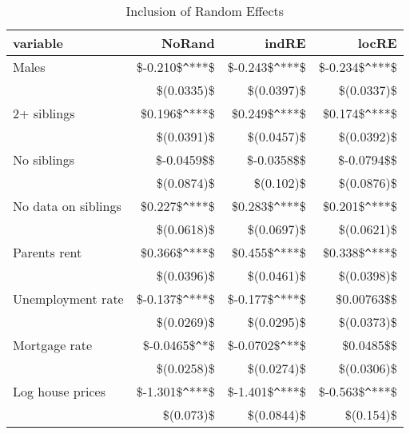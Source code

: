 \begin{table}[ht]
\centering
\begin{tabular}{lrrr}
  \hline
variable & NoRand & indRE & locRE \\ 
  \hline
Males & \$-0.210\$\verb|^|***\$ & \$-0.243\$\verb|^|***\$ & \$-0.234\$\verb|^|***\$ \\ 
   & \$(0.0335)\$ & \$(0.0397)\$ & \$(0.0337)\$ \\ 
  2+ siblings & \$0.196\$\verb|^|***\$ & \$0.249\$\verb|^|***\$ & \$0.174\$\verb|^|***\$ \\ 
   & \$(0.0391)\$ & \$(0.0457)\$ & \$(0.0392)\$ \\ 
  No siblings & \$-0.0459\$\$ & \$-0.0358\$\$ & \$-0.0794\$\$ \\ 
   & \$(0.0874)\$ & \$(0.102)\$ & \$(0.0876)\$ \\ 
  No data on siblings & \$0.227\$\verb|^|***\$ & \$0.283\$\verb|^|***\$ & \$0.201\$\verb|^|***\$ \\ 
   & \$(0.0618)\$ & \$(0.0697)\$ & \$(0.0621)\$ \\ 
  Parents rent & \$0.366\$\verb|^|***\$ & \$0.455\$\verb|^|***\$ & \$0.338\$\verb|^|***\$ \\ 
   & \$(0.0396)\$ & \$(0.0461)\$ & \$(0.0398)\$ \\ 
  Unemployment rate & \$-0.137\$\verb|^|***\$ & \$-0.177\$\verb|^|***\$ & \$0.00763\$\$ \\ 
   & \$(0.0269)\$ & \$(0.0295)\$ & \$(0.0373)\$ \\ 
  Mortgage rate & \$-0.0465\$\verb|^|*\$ & \$-0.0702\$\verb|^|**\$ & \$0.0485\$\$ \\ 
   & \$(0.0258)\$ & \$(0.0274)\$ & \$(0.0306)\$ \\ 
  Log house prices & \$-1.301\$\verb|^|***\$ & \$-1.401\$\verb|^|***\$ & \$-0.563\$\verb|^|***\$ \\ 
   & \$(0.073)\$ & \$(0.0844)\$ & \$(0.154)\$ \\ 
   \hline
\end{tabular}
\caption{Inclusion of Random Effects} 
\label{random}
\end{table}

